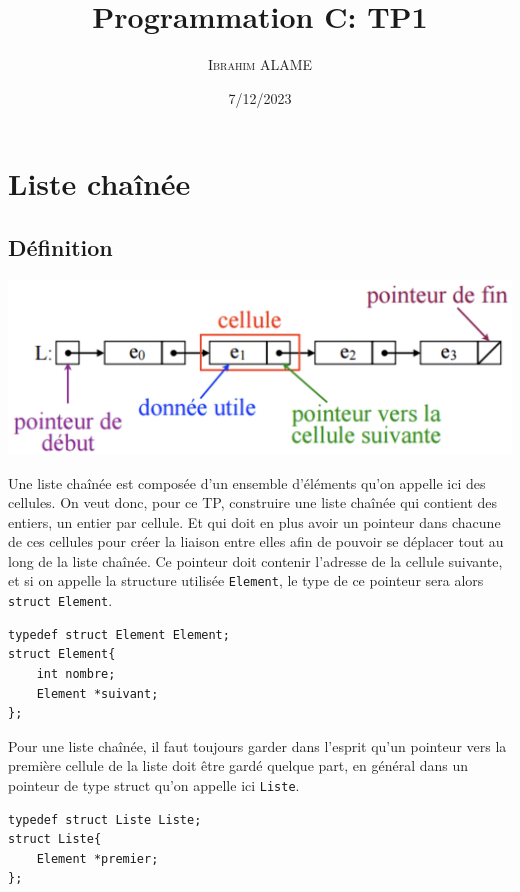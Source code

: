 \documentclass[a4paper]{article}
\title{Programmation C: TP1}
\author{ \textsc{Ibrahim ALAME}}
\date{7/12/2023}
\begin{document}
\maketitle

\section{Liste chaînée}
\subsection{Définition}
\begin{center}
\includegraphics[scale=0.25]{liste01.png} 
\end{center}  

  Une liste chaînée est composée d'un ensemble d'éléments qu'on appelle ici des cellules. On veut donc, pour ce TP, construire une liste chaînée qui contient des entiers, un entier par cellule. Et qui doit en plus avoir un pointeur dans chacune de ces cellules pour créer la liaison entre elles afin de pouvoir se déplacer tout au long de la liste chaînée. Ce pointeur doit contenir l'adresse de la cellule suivante, et si on appelle la structure utilisée {\tt Element}, le type de ce pointeur sera alors {\tt struct Element}.
\begin{verbatim}
typedef struct Element Element;
struct Element{
    int nombre;
    Element *suivant;
};
\end{verbatim}

Pour une liste chaînée, il faut toujours garder dans l'esprit qu'un pointeur vers la première cellule de la liste doit être gardé quelque part, en général dans un pointeur de type struct qu'on appelle ici {\tt Liste}.

\begin{verbatim}
typedef struct Liste Liste;
struct Liste{
    Element *premier;
};
\end{verbatim}
\end{document}
